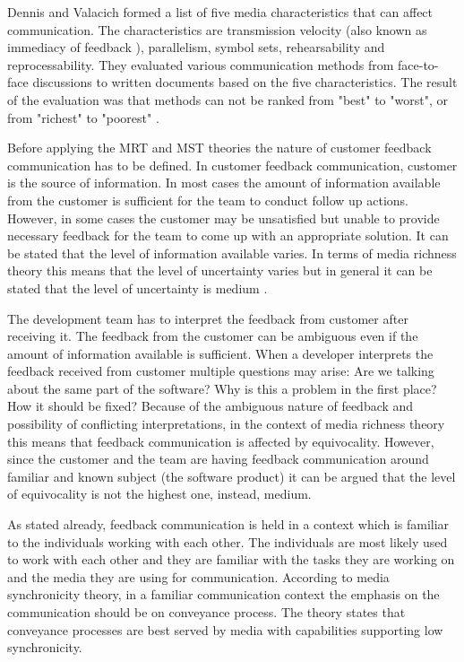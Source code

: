 \documentclass[conference]{IEEEtran}
\begin{document}
Dennis and Valacich formed a list of five media characteristics that can affect communication. The characteristics are transmission velocity (also known as immediacy of feedback \cite{1999dennis}), parallelism, symbol sets, rehearsability and reprocessability. They evaluated various communication methods from face-to-face discussions to written documents based on the five characteristics. The result of the evaluation was that methods can not be ranked from "best" to "worst", or from "richest" to "poorest" \cite{2008dennis}. 

Before applying the MRT and MST theories the nature of customer feedback communication has to be defined. In customer feedback communication, customer is the source of information. In most cases the amount of information available from the customer is sufficient for the team to conduct follow up actions. However, in some cases the customer may be unsatisfied but unable to provide necessary feedback for the team to come up with an appropriate solution. It can be stated that the level of information available varies. In terms of media richness theory this means that the level of uncertainty varies but in general it can be stated that the level of uncertainty is medium \cite{1986daft}. 

The development team has to interpret the feedback from customer after receiving it. The feedback from the customer can be ambiguous even if the amount of information available is sufficient. When a developer interprets the feedback received from customer multiple questions may arise: Are we talking about the same part of the software? Why is this a problem in the first place? How it should be fixed? Because of the ambiguous nature of feedback and possibility of conflicting interpretations, in the context of media richness theory this means that feedback communication is affected by equivocality. However, since the customer and the team are having feedback communication around familiar and known subject (the software product) it can be argued that the level of equivocality is not the highest one, instead, medium.

As stated already, feedback communication is held in a context which is familiar to the individuals working with each other. The individuals are most likely used to work with each other and they are familiar with the tasks they are working on and the media they are using for communication. According to media synchronicity theory, in a familiar communication context the emphasis on the communication should be on conveyance process. The theory states that conveyance processes are best served by media with capabilities supporting low synchronicity.
\end{document}
